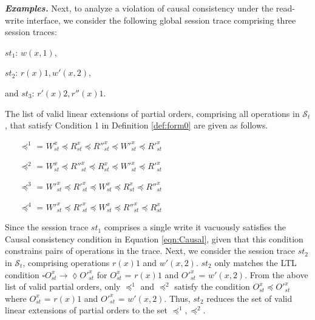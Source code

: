 \documentclass[journal,compsoc]{IEEEtran}
\begin{document}
\noindent \emph{\textbf{Examples.}}
  Next, to analyze a violation of causal consistency under the read-write interface, we consider the following global session trace comprising three  session traces: 
  
  $\mathit{st}_1$: $w(x,1)$, %
  
 $\mathit{st}_2$: $r(x){1}, w'(x,2)$, %
 
 and  $\mathit{st}_3$: $r'(x){2}, r''(x){1}$. 
 
 The list of valid linear extensions of partial orders, comprising all operations in $\mathcal{S}_t$, that satisfy Condition 1 in Definition \ref{def:form0} are given as follows.   
 \begin{itemize}
 \item [$\preccurlyeq^1$ =] $W^x_{\mathit{st}}   \preccurlyeq R^x_{\mathit{st}}  \preccurlyeq R''^x_{\mathit{st}}  \preccurlyeq W'^x_{\mathit{st}}   \preccurlyeq R'^x_{\mathit{st}} $ 
 \item [$\preccurlyeq^2$ =] $ W^x_{\mathit{st}}   \preccurlyeq R''^x_{\mathit{st}}  \preccurlyeq R^x_{\mathit{st}}   \preccurlyeq W'^x_{\mathit{st}}  \preccurlyeq R'^x_{\mathit{st}}$
 \item [$\preccurlyeq^3$ =] $   W'^x_{\mathit{st}}  \preccurlyeq R'^x_{\mathit{st}} \preccurlyeq  W^x_{\mathit{st}}  \preccurlyeq R^x_{\mathit{st}} \preccurlyeq R''^x_{\mathit{st}}$
 \item [$\preccurlyeq^4$ =] $  W'^x_{\mathit{st}}  \preccurlyeq R'^x_{\mathit{st}} \preccurlyeq W^x_{\mathit{st}}  \preccurlyeq R''^x_{\mathit{st}} \preccurlyeq R^x_{\mathit{st}}  $
 \end{itemize} %
 Since the session trace  $\mathit{st}_1$ comprises a single write it vacuously satisfies the Causal consistency condition  in Equation \ref{eqn:Causal}, given that this condition constrains pairs of operations in the trace. 
   Next, we consider the  session trace $\mathit{st}_2$ in $\mathcal{S}_t$, comprising operations $r(x){1}$ and $w'(x,2)$. $\mathit{st}_2$ only matches the LTL condition $ \square {\mathit{O}}^x_{\mathit{st}} \rightarrow \lozenge {\mathit{O}}'^x_{\mathit{st}}$ for ${\mathit{O}}^x_{\mathit{st}}$ = $r(x){1}$ and  ${\mathit{O}}'^x_{\mathit{st}}$ = $w'(x,2)$.  From the above list of valid partial orders, only $\preccurlyeq^1$ and $\preccurlyeq^2$ satisfy the  condition ${\mathit{O}}^x_{\mathit{st}} \preccurlyeq {\mathit{O}}'^x_{\mathit{st}}$ where ${\mathit{O}}^x_{\mathit{st}}$ = $r(x){1}$ and  ${\mathit{O}}'^x_{\mathit{st}}$ = $w'(x,2)$. Thus, $\mathit{st}_2$ reduces the set of valid linear extensions of partial orders to the set $\preccurlyeq^1, \preccurlyeq^2$.
\end{document}
